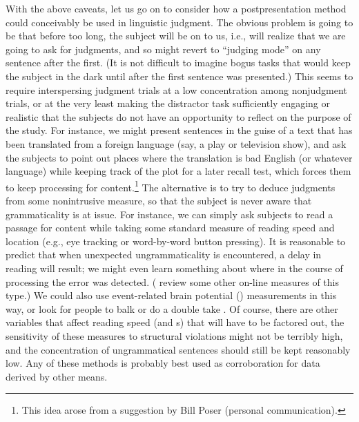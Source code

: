 With the above caveats, let us go on to consider how a postpresentation method could conceivably be used in linguistic judgment. The obvious problem is going to be that before too long, the subject will be on to us, i.e., will realize that we are going to ask for judgments, and so might revert to ``judging mode'' on any
sentence after the first. (It is not difficult to imagine bogus tasks that would keep the subject in the dark until after the first sentence was presented.) This seems to require interspersing judgment trials at a low concentration among nonjudgment trials, or at the very least making the distractor task sufficiently engaging or realistic that the subjects do not have an opportunity to reflect on the purpose of the study. For instance, we might present sentences in the guise of a text that has been translated from a foreign language (say, a play or television show), and ask the subjects to point out places where the translation is bad English (or whatever language) while keeping track of the plot for a later recall test, which forces them to keep processing for content.\footnote{This idea arose from a suggestion by Bill Poser (personal communication).}
 The alternative is to try to deduce judgments from some nonintrusive measure, so that the subject is never aware that grammaticality is at issue. For instance, we can simply ask subjects to read a passage for content while taking some standard measure of reading speed and location (e.g., eye tracking or word-by-word button pressing). It is reasonable to predict that when unexpected ungrammaticality is encountered, a delay in reading will result; we might even learn something about where in the course of processing the error was detected. (\citet{KutasEtAl1983} review some other on-line measures of this type.) We could also use event-related brain potential () measurements in this way, or look for people to balk or do a double take \citep{Newmeyer1983}. Of course, there are other variables that affect reading speed (and s) that will have to be factored out, the sensitivity of these measures to structural violations might not be terribly high, and the concentration of ungrammatical sentences should still be kept reasonably low. Any of these methods is probably best used as corroboration for data derived by other means.

